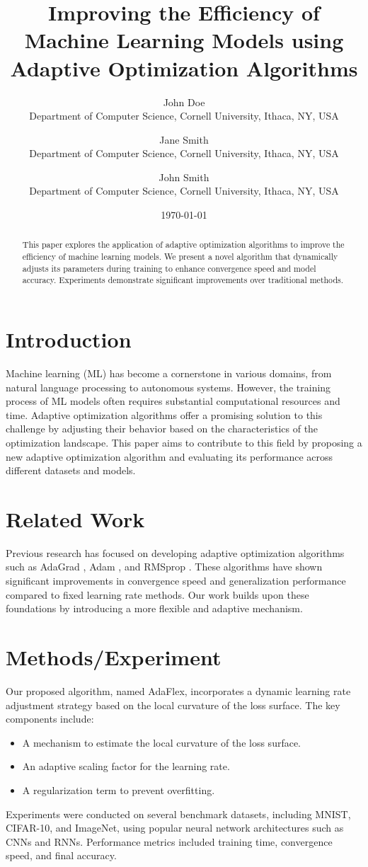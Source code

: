 \documentclass{article}
\title{Improving the Efficiency of Machine Learning Models using Adaptive Optimization Algorithms}
\author{John Doe \\
Department of Computer Science, Cornell University, Ithaca, NY, USA \\
\and Jane Smith \\
Department of Computer Science, Cornell University, Ithaca, NY, USA \\
\and John Smith \\
Department of Computer Science, Cornell University, Ithaca, NY, USA \\
}
\date{\today}
\begin{document}
\maketitle

\begin{abstract}
This paper explores the application of adaptive optimization algorithms to improve the efficiency of machine learning models. We present a novel algorithm that dynamically adjusts its parameters during training to enhance convergence speed and model accuracy. Experiments demonstrate significant improvements over traditional methods.
\end{abstract}

\section{Introduction}
Machine learning (ML) has become a cornerstone in various domains, from natural language processing to autonomous systems. However, the training process of ML models often requires substantial computational resources and time. Adaptive optimization algorithms offer a promising solution to this challenge by adjusting their behavior based on the characteristics of the optimization landscape. This paper aims to contribute to this field by proposing a new adaptive optimization algorithm and evaluating its performance across different datasets and models.

\section{Related Work}
Previous research has focused on developing adaptive optimization algorithms such as AdaGrad \cite{Duchi2011}, Adam \cite{Kingma2014}, and RMSprop \cite{Tieleman2012}. These algorithms have shown significant improvements in convergence speed and generalization performance compared to fixed learning rate methods. Our work builds upon these foundations by introducing a more flexible and adaptive mechanism.

\section{Methods/Experiment}
Our proposed algorithm, named AdaFlex, incorporates a dynamic learning rate adjustment strategy based on the local curvature of the loss surface. The key components include:
\begin{itemize}
    \item A mechanism to estimate the local curvature of the loss surface.
    \item An adaptive scaling factor for the learning rate.
    \item A regularization term to prevent overfitting.
\end{itemize}
Experiments were conducted on several benchmark datasets, including MNIST, CIFAR-10, and ImageNet, using popular neural network architectures such as CNNs and RNNs. Performance metrics included training time, convergence speed, and final accuracy.
\end{document}
